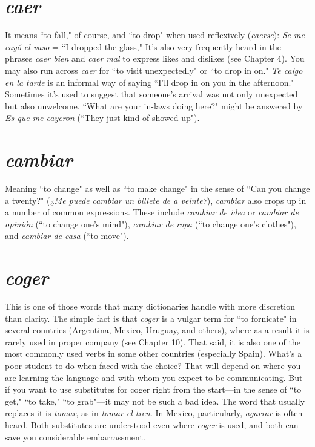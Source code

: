 \section{\emph{caer}}

It means ``to fall," of course, and ``to drop" when used reflexively (\emph{caerse}): \emph{Se me cayó el vaso} = ``I dropped the glass," It's also
very frequently heard in the phrases \emph{caer bien} and \emph{caer mal} to express
likes and dislikes (see Chapter 4). You may also run across \emph{caer} for ``to
visit unexpectedly" or ``to drop in on." \emph{Te caigo en la tarde} is an informal way of saying ``I'll drop in on you in the afternoon." Sometimes
it's used to suggest that someone's arrival was not only unexpected but
also unwelcome. ``What are your in-laws doing here?" might be answered by \emph{Es que me cayeron} (``They just kind of showed up").

\section{\emph{cambiar}}

Meaning ``to change" as well as ``to make change" in the sense
of ``Can you change a twenty?" (\emph{¿Me puede cambiar un billete de a
veinte?}), \emph{cambiar} also crops up in a number of common expressions.
These include \emph{cambiar de idea} or \emph{cambiar de opinión} (``to change
one's mind"), \emph{cambiar de ropa} (``to change one's clothes"), and \emph{cambiar de casa} (``to move").

\section{\emph{coger}}

This is one of those words that many dictionaries handle with
more discretion than clarity. The simple fact is that \emph{coger} is a vulgar
term for ``to fornicate" in several countries (Argentina, Mexico, Uruguay, and others), where as a result it is rarely used in proper company
(see Chapter 10). That said, it is also one of the most commonly used
verbs in some other countries (especially Spain). What's a poor student
to do when faced with the choice? That will depend on where you are
learning the language and with whom you expect to be communicating. But if you want to use substitutes for coger right from the start---in the sense of ``to get," ``to take," ``to grab"---it may not be such a bad
idea. The word that usually replaces it is \emph{tomar}, as in \emph{tomar el tren}. In
Mexico, particularly, \emph{agarrar} is often heard. Both substitutes are 
understood even where \emph{coger} is used, and both can save you considerable
embarrassment.

